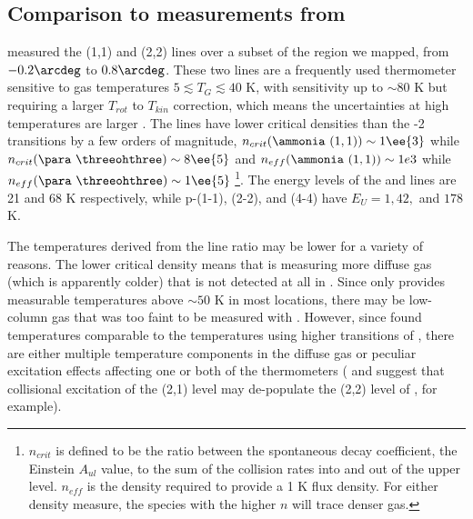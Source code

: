 \subsection{Comparison to \ammonia measurements from \citet{Ott2014a}}
\label{sec:ammoniacompare}
\citet{Ott2014a} measured the \ammonia (1,1) and (2,2) lines over a subset of the
region we mapped, from $-0.2\arcdeg$ to $0.8\arcdeg$.  These two lines are
a frequently
used thermometer sensitive to gas temperatures $5 \lesssim T_G \lesssim 40$ K,
with sensitivity up to $\sim80$ K but requiring a larger $T_{rot}$ to $T_{kin}$
correction, which means the uncertainties at high temperatures are larger
\citep[][Figure 1]{Mangum2013a}.  The \ammonia lines have lower critical
densities than the -2 transitions by a few orders of magnitude,
$n_{crit}(\textrm{\ammonia}~(1,1))\sim1\ee{3}$ \percc while $n_{crit}(\para~
\threeohthree)\sim8\ee{5}$ \percc and $n_{eff}(\textrm{\ammonia}~(1,1))\sim1e3$
while $n_{eff}(\para~\threeohthree)\sim1\ee{5}$
\citep[][]{Shirley2015a}\footnote{$n_{crit}$ is defined to be the ratio between
the spontaneous decay coefficient, the Einstein $A_{ul}$ value, to the sum of
the collision rates into and out of the upper level.  $n_{eff}$ is the density
required to provide a 1 K \kms flux density.  For either density measure, the
species with the higher $n$ will trace denser gas.}.
The energy levels of the \threeohthree and \threetwoone lines are 21 and 68 K
respectively, while p-\ammonia (1-1), (2-2), and (4-4) have
$E_U = 1, 42, $ and $178$ K.

The temperatures derived from the \ammonia line ratio may be lower for a
variety of reasons.  The lower critical density means that \ammonia is
measuring more diffuse gas (which is apparently colder) that is not detected at
all in \formaldehyde.  Since \formaldehyde only provides measurable
temperatures above $\sim50$ K in most locations, there may be low-column gas
that was too faint to be measured with \formaldehyde.  However, since
\citet{Guesten1981a} found temperatures comparable to the \formaldehyde
temperatures using higher transitions of \ammonia, there are either multiple
temperature components in the diffuse gas or peculiar excitation effects
affecting one or both of the thermometers (\citet{Guesten1981a} and
\citet{Morris1973a} suggest that collisional excitation of the (2,1) level may
de-populate the (2,2) level of \ammonia, for example).


